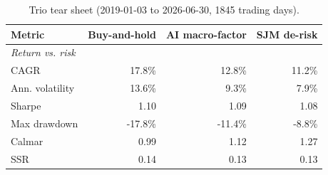 \begin{table}[htbp]
  \centering
  \caption{Trio tear sheet (2019-01-03 to 2026-06-30, 1845 trading days).}
  \label{tab:tearsheet-paper}
  \begin{tabular}{lrrr}
    \toprule
    Metric & Buy-and-hold & AI macro-factor & SJM de-risk \\
    \midrule
    \multicolumn{4}{l}{\textit{Return vs. risk}} \\
    CAGR & 17.8\% & 12.8\% & 11.2\% \\
    Ann. volatility & 13.6\% & 9.3\% & 7.9\% \\
    Sharpe & 1.10 & 1.09 & 1.08 \\
    Max drawdown & -17.8\% & -11.4\% & -8.8\% \\
    Calmar & 0.99 & 1.12 & 1.27 \\
    SSR & 0.14 & 0.13 & 0.13 \\
    \bottomrule
  \end{tabular}
\end{table}

